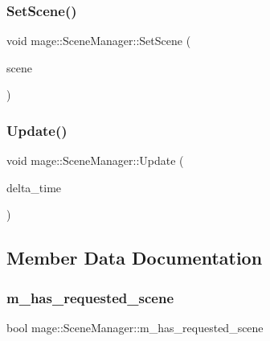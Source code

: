 \hypertarget{classmage_1_1_scene_manager_abd9572b72caa412eda1f6c4e5d771fc3}{}\label{classmage_1_1_scene_manager_abd9572b72caa412eda1f6c4e5d771fc3} 
\subsubsection{\texorpdfstring{Set\+Scene()}{SetScene()}}
{\footnotesize\ttfamily void mage\+::\+Scene\+Manager\+::\+Set\+Scene (\begin{DoxyParamCaption}\item[{\hyperlink{namespacemage_a3316d7143a973e37adf1110f2e80ca31}{Unique\+Ptr}$<$ \hyperlink{classmage_1_1_scene}{Scene} $>$ \&\&}]{scene }\end{DoxyParamCaption})}

\hypertarget{classmage_1_1_scene_manager_a10c718ddfca8caa4bdc6f1cbf1daf12f}{}\label{classmage_1_1_scene_manager_a10c718ddfca8caa4bdc6f1cbf1daf12f} 
\subsubsection{\texorpdfstring{Update()}{Update()}}
{\footnotesize\ttfamily void mage\+::\+Scene\+Manager\+::\+Update (\begin{DoxyParamCaption}\item[{\hyperlink{namespacemage_ad26233bbec640deda836e572c1a23708}{F64}}]{delta\+\_\+time }\end{DoxyParamCaption})}



\subsection{Member Data Documentation}
\hypertarget{classmage_1_1_scene_manager_aff9889d9fc53a3524b0e88d10cd544d6}{}\label{classmage_1_1_scene_manager_aff9889d9fc53a3524b0e88d10cd544d6} 
\subsubsection{\texorpdfstring{m\+\_\+has\+\_\+requested\+\_\+scene}{m\_has\_requested\_scene}}
{\footnotesize\ttfamily bool mage\+::\+Scene\+Manager\+::m\+\_\+has\+\_\+requested\+\_\+scene\hspace{0.3cm}{\ttfamily [private]}}

